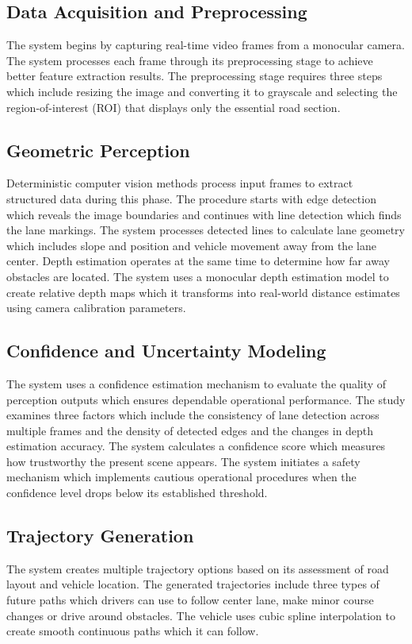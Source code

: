 \documentclass[conference]{IEEEtran}
\begin{document}
\subsection{Data Acquisition and Preprocessing}
The system begins by capturing real-time video frames from a monocular camera. The system processes each frame through its preprocessing stage to achieve better feature extraction results. The preprocessing stage requires three steps which include resizing the image and converting it to grayscale and selecting the region-of-interest (ROI) that displays only the essential road section.

\subsection{Geometric Perception}
Deterministic computer vision methods process input frames to extract structured data during this phase. The procedure starts with edge detection which reveals the image boundaries and continues with line detection which finds the lane markings. The system processes detected lines to calculate lane geometry which includes slope and position and vehicle movement away from the lane center. Depth estimation operates at the same time to determine how far away obstacles are located. The system uses a monocular depth estimation model to create relative depth maps which it transforms into real-world distance estimates using camera calibration parameters.

\subsection{Confidence and Uncertainty Modeling}
The system uses a confidence estimation mechanism to evaluate the quality of perception outputs which ensures dependable operational performance. The study examines three factors which include the consistency of lane detection across multiple frames and the density of detected edges and the changes in depth estimation accuracy. The system calculates a confidence score which measures how trustworthy the present scene appears. The system initiates a safety mechanism which implements cautious operational procedures when the confidence level drops below its established threshold.

\subsection{Trajectory Generation}
The system creates multiple trajectory options based on its assessment of road layout and vehicle location. The generated trajectories include three types of future paths which drivers can use to follow center lane, make minor course changes or drive around obstacles. The vehicle uses cubic spline interpolation to create smooth continuous paths which it can follow.
\end{document}
